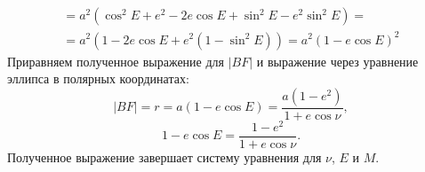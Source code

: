 {\begin{multline*}
		= a^2 \left( \cos^2 E + e^2 - 2 e \cos E + \sin^2 E - e^2 \sin^2 E \right) = \\
		= a^2 \left( 1 - 2 e \cos E + e^2 \left( 1 - \sin^2 E \right) \right) = a^2 \left( 1 - e \cos E \right)^2
\end{multline*}
Приравняем полученное выражение для $|BF|$ и выражение через уравнение эллипса в полярных координатах:
\begin{equation*}
	|BF| = r = a \left( 1 - e \cos E \right) = \frac{a \left(1 - e^2 \right)}{ 1 + e \cos \nu},
\end{equation*}
\begin{equation*}
	 1 - e \cos E  = \frac{1 - e^2}{ 1 + e \cos \nu}.
\end{equation*}
 Полученное выражение завершает систему уравнения для $\nu$, $E$ и $M$.
}

